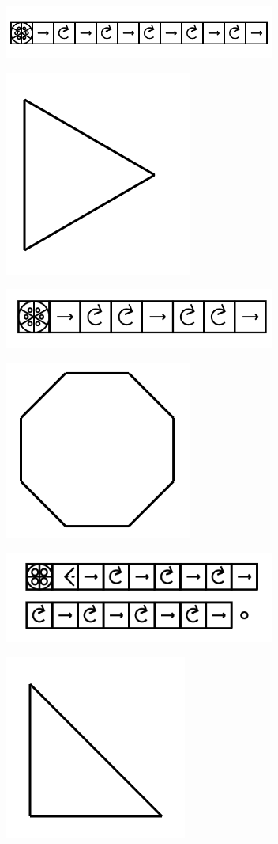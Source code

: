 \documentclass[11pt]{article}
\begin{document}
\includegraphics[width=3.5in]{image9.png}

\includegraphics{image10.png}

\includegraphics[width=3.5in]{image11.png}

\includegraphics{image12.png}

\includegraphics[width=3.5in]{image13.png}

\includegraphics{image14.png}
\end{document}
